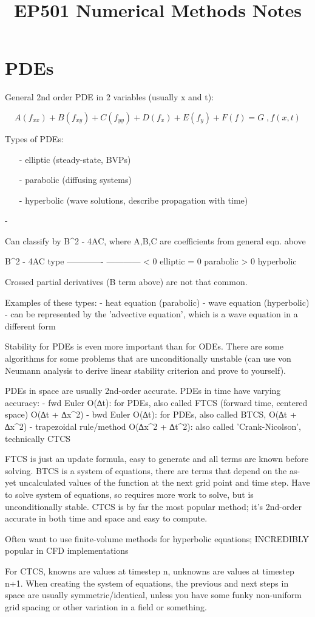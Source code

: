 \documentclass[10pt,a4paper]{article}
\title{EP501 Numerical Methods Notes}
\begin{document}
\maketitle

\section{PDEs}
General 2nd order PDE in 2 variables (usually x and t):

\begin{equation}
A(f_{xx}) + B(f_{xy}) + C(f_{yy}) + D(f_x) + E(f_y) + F(f) = G\;,f(x,t)
\end{equation}

Types of PDEs:
\begin{itemize}
\item[-] elliptic (steady-state, BVPs)
\item[-] parabolic (diffusing systems)
\item[-] hyperbolic (wave solutions, describe propagation with time)
\end{itemize}
- 

Can classify by B^2 - 4AC, where A,B,C are coefficients from general eqn. above

  B^2 - 4AC         type
-------------   ------------
    < 0           elliptic
    = 0          parabolic
    > 0          hyperbolic

Crossed partial derivatives (B term above) are not that common.

Examples of these types:
- heat equation (parabolic)
- wave equation (hyperbolic)
    - can be represented by the 'advective equation', which is a wave equation in a different form

Stability for PDEs is even more important than for ODEs. There are some algorithms for some problems that are unconditionally unstable (can use von Neumann analysis to derive linear stability criterion and prove to yourself).

PDEs in space are usually 2nd-order accurate. PDEs in time have varying accuracy:
- fwd Euler O(∆t): for PDEs, also called FTCS (forward time, centered space) O(∆t + ∆x^2)
- bwd Euler O(∆t): for PDEs, also called BTCS, O(∆t + ∆x^2)
- trapezoidal rule/method O(∆x^2 + ∆t^2): also called 'Crank-Nicolson', technically CTCS

FTCS is just an update formula, easy to generate and all terms are known before solving. BTCS is a system of equations, there are terms that depend on the as-yet uncalculated values of the function at the next grid point and time step. Have to solve system of equations, so requires more work to solve, but is unconditionally stable. CTCS is by far the most popular method; it's 2nd-order accurate in both time and space and easy to compute.

Often want to use finite-volume methods for hyperbolic equations; INCREDIBLY popular in CFD implementations

For CTCS, knowns are values at timestep n, unknowns are values at timestep n+1. When creating the system of equations, the previous and next steps in space are usually symmetric/identical, unless you have some funky non-uniform grid spacing or other variation in a field or something.
\end{document}
